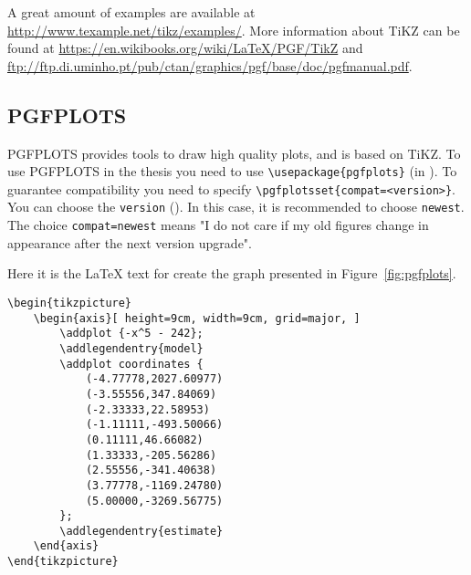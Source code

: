 




A great amount of examples are available at \url{http://www.texample.net/tikz/examples/}. 
More information about TiKZ can be found at 
\url{https://en.wikibooks.org/wiki/LaTeX/PGF/TikZ} and 
\url{ftp://ftp.di.uminho.pt/pub/ctan/graphics/pgf/base/doc/pgfmanual.pdf}.

\subsection{PGFPLOTS}

PGFPLOTS provides tools to draw high quality plots, and is based on TiKZ. To use PGFPLOTS in the thesis you need to use \verb|\usepackage{pgfplots}| (in ).
To guarantee compatibility you need to specify \verb|\pgfplotsset{compat=<version>}|.
You can choose the \verb|version| ().
In this case, it is recommended to choose \verb|newest|. The choice \verb|compat=newest| means "I do not care if my old figures change in appearance after the next version upgrade".

Here it is the \LaTeX{} text for create the graph presented in Figure~\ref{fig:pgfplots}.
\begin{verbatim}
\begin{tikzpicture} 
	\begin{axis}[ height=9cm, width=9cm, grid=major, ] 
		\addplot {-x^5 - 242}; 
		\addlegendentry{model}
		\addplot coordinates { 
			(-4.77778,2027.60977) 
			(-3.55556,347.84069) 
			(-2.33333,22.58953) 
			(-1.11111,-493.50066) 
			(0.11111,46.66082) 
			(1.33333,-205.56286) 
			(2.55556,-341.40638) 
			(3.77778,-1169.24780) 
			(5.00000,-3269.56775) 
		}; 
		\addlegendentry{estimate} 
	\end{axis} 
\end{tikzpicture}
\end{verbatim}

